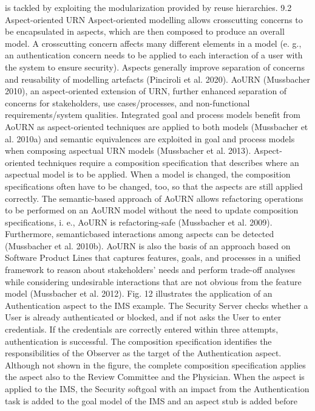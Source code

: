 is tackled by exploiting the modularization provided by reuse hierarchies.
9.2 Aspect-oriented URN
Aspect-oriented modelling allows crosscutting
concerns to be encapsulated in aspects, which are
then composed to produce an overall model. A
crosscutting concern affects many different elements in a model (e. g., an authentication concern
needs to be applied to each interaction of a user
with the system to ensure security). Aspects generally improve separation of concerns and reusability
of modelling artefacts (Pinciroli et al. 2020).
AoURN (Mussbacher 2010), an aspect-oriented
extension of URN, further enhanced separation
of concerns for stakeholders, use cases/processes,
and non-functional requirements/system qualities.
Integrated goal and process models benefit from
AoURN as aspect-oriented techniques are applied
to both models (Mussbacher et al. 2010a) and
semantic equivalences are exploited in goal and
process models when composing aspectual URN
models (Mussbacher et al. 2013). Aspect-oriented
techniques require a composition specification that
describes where an aspectual model is to be applied. When a model is changed, the composition
specifications often have to be changed, too, so
that the aspects are still applied correctly. The
semantic-based approach of AoURN allows refactoring operations to be performed on an AoURN
model without the need to update composition
specifications, i. e., AoURN is refactoring-safe
(Mussbacher et al. 2009). Furthermore, semanticbased interactions among aspects can be detected
(Mussbacher et al. 2010b). AoURN is also the
basis of an approach based on Software Product
Lines that captures features, goals, and processes
in a unified framework to reason about stakeholders’ needs and perform trade-off analyses while
considering undesirable interactions that are not
obvious from the feature model (Mussbacher et al.
2012).
Fig. 12 illustrates the application of an Authentication aspect to the IMS example. The Security
Server checks whether a User is already authenticated or blocked, and if not asks the User to enter
credentials. If the credentials are correctly entered
within three attempts, authentication is successful. The composition specification identifies the
responsibilities of the Observer as the target of
the Authentication aspect. Although not shown in
the figure, the complete composition specification
applies the aspect also to the Review Committee
and the Physician. When the aspect is applied to
the IMS, the Security softgoal with an impact from
the Authentication task is added to the goal model
of the IMS and an aspect stub is added before
